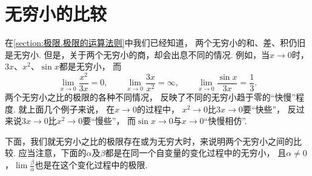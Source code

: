 \section{无穷小的比较}
在\cref{section:极限.极限的运算法则}中我们已经知道，
两个无穷小的和、差、积仍旧是无穷小.
但是，关于两个无穷小的商，却会出息不同的情况.
例如，当\(x\to0\)时，
\(3x\)、\(x^2\)、\(\sin x\)都是无穷小，
而\[
	\lim_{x\to0}\frac{x^2}{3x}=0, \qquad
	\lim_{x\to0}\frac{3x}{x^2}=\infty, \qquad
	\lim_{x\to0}\frac{\sin x}{3x}=\frac{1}{3}.
\]
两个无穷小之比的极限的各种不同情况，
反映了不同的无穷小趋于零的“快慢”程度.
就上面几个例子来说，
在\(x\to0\)的过程中，
\(x^2\to0\)比\(3x\to0\)要“快些”，
反过来说\(3x\to0\)比\(x^2\to0\)要“慢些”，
而\(\sin x\to0\)与\(x\to0\)“快慢相仿”.

下面，我们就无穷小之比的极限存在或为无穷大时，来说明两个无穷小之间的比较.
应当注意，下面的\(\alpha\)及\(\beta\)都是在同一个自变量的变化过程中的无穷小，
且\(\alpha\neq0\)，\(\lim\frac{\beta}{\alpha}\)也是在这个变化过程中的极限.
